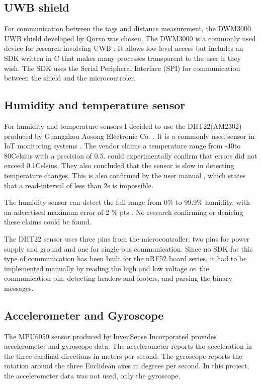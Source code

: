 \subsection{UWB shield}
For communication between the tags and distance measurement, the DWM3000 UWB shield developed by Qorvo was chosen.
The DWM3000 is a commonly used device for research involving UWB \cite{coppens2022overview, leu2022ghost, stocker2022performance}.
It allows low-level access but includes an SDK written in C that makes many processes transparent to the user if they wish.
The SDK uses the Serial Peripheral Interface (SPI) for communication between the shield and the microcontroler.



\subsection{Humidity and temperature sensor}

For humidity and temperature sensors I decided to use the DHT22(AM2302) produced by Guangzhou Aosong Electronic Co. \cite{AM2302}. 
It is a commonly used sensor in IoT monitoring systems \cite{ahmad2021evaluation}. 
The vendor claims a temperature range from -40\degree to 80\degree Celsius with a precision of 0.5\degree. 
\cite{ahmad2021evaluation} could experimentally confirm that errors did not exceed 0.1\degree Celsius. 
They also concluded that the sensor is slow in detecting temperature changes. 
This is also confirmed by the user manual \cite{AM2302}, which states that a read-interval of less than 2s is impossible. 

The humidity sensor can detect the full range from 0\% to 99.9\% humidity, with an advertised maximum error of 2 \% pts \cite{AM2302}.
No research confirming or denieing these claims could be found.

The DHT22 sensor uses three pins from the microcontroller: two pins for power supply and ground and one for single-bus communication.
Since no SDK for this type of communication has been built for the nRF52 board series, it had to be implemented manually by reading the high and low voltage on the communication pin, detecting headers and footers, and parsing the binary messages. 

\subsection{Accelerometer and Gyroscope}
The MPU6050 sensor produced by InvenSense Incorporated provides accelerometer and gyroscope data.
The accelerometer reports the acceleration in the three cardinal directions in meters per second.
The gyroscope reports the rotation around the three Euclidean axes in degrees per second.
In this project, the accelerometer data was not used, only the gyroscope.

